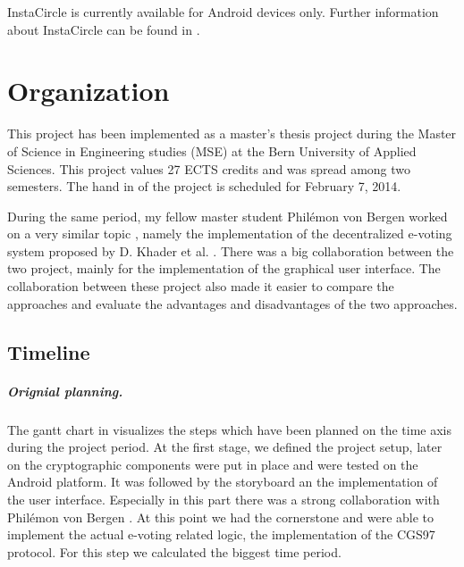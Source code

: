 \documentclass[numbers=noenddot, abstract=on, a4paper, headsepline,
footsepline, oneside, draft=off]{scrreprt}
\begin{document}
InstaCircle is currently available for Android devices only. Further information
about InstaCircle can be found in \cite{ritter13a}.



\chapter{Organization}
\label{cha:organization}
This project has been implemented as a master's thesis project during the
Master of Science in Engineering studies (MSE) at the Bern University of Applied
Sciences. This project values 27 ECTS credits and was spread among two
semesters.
The hand in of the project is scheduled for February 7, 2014.

During the same period, my fellow master student Philémon von Bergen worked on a
very similar topic \cite{vonBergen14}, namely the implementation of the
decentralized e-voting system proposed by D. Khader et al. \cite{HKRS12}. There
was a big collaboration between the two project, mainly for the implementation
of the graphical user interface. The collaboration between these project also
made it easier to compare the approaches and evaluate the advantages and
disadvantages of the two approaches.

\section{Timeline}
\label{sec:planning}
\paragraph{Orignial planning.} The gantt chart in 
visualizes the steps which have been planned on the time axis during the project period. At the first stage, we
defined the project setup, later on the cryptographic components were put in
place and were tested on the Android platform. It was followed by the storyboard
an the implementation of the user interface. Especially in this part there was a
strong collaboration with Philémon von Bergen \cite{vonBergen14}. At this point
we had the cornerstone and were able to implement the actual e-voting related
logic, the implementation of the CGS97 protocol. For this step we calculated the
biggest time period.
\end{document}

